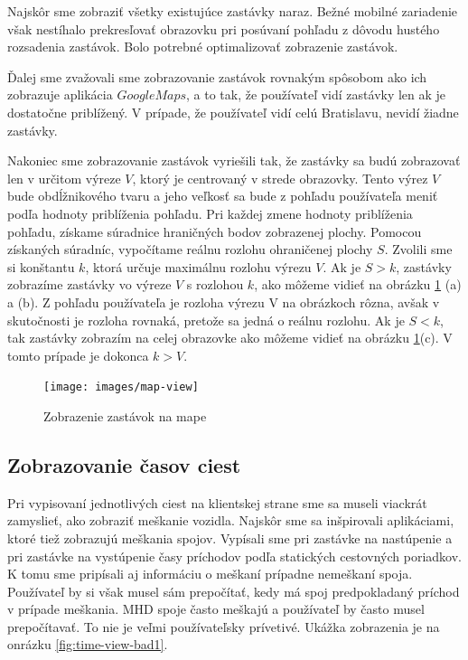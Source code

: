 Najskôr sme zobraziť všetky existujúce zastávky naraz. Bežné mobilné zariadenie však nestíhalo prekresľovať obrazovku pri posúvaní pohľadu z dôvodu hustého rozsadenia zastávok. Bolo potrebné optimalizovať zobrazenie zastávok. 

Ďalej sme zvažovali sme zobrazovanie zastávok rovnakým spôsobom ako ich zobrazuje aplikácia $Google Maps$, a to tak, že používateľ vidí zastávky len ak je dostatočne priblížený. V prípade, že používateľ vidí celú Bratislavu, nevidí žiadne zastávky. 

Nakoniec sme zobrazovanie zastávok vyriešili tak, že zastávky sa budú zobrazovať len v určitom výreze $V$, ktorý je centrovaný v strede obrazovky. Tento výrez $V$ bude obdĺžnikového tvaru a jeho veľkosť sa bude z pohľadu používateľa meniť podľa hodnoty priblíženia pohľadu. 
Pri každej zmene hodnoty priblíženia pohľadu, získame súradnice hraničných bodov zobrazenej plochy. Pomocou získaných súradníc, vypočítame reálnu rozlohu ohraničenej plochy $S$. Zvolili sme si konštantu $k$, ktorá určuje maximálnu rozlohu výrezu $V$. 
Ak je $S > k$, zastávky zobrazíme zastávky vo výreze $V$ s rozlohou $k$, ako môžeme vidieť na obrázku \ref{fig:map-view} (a) a (b). Z pohľadu používateľa je rozloha výrezu V na obrázkoch rôzna, avšak v skutočnosti je rozloha rovnaká, pretože sa jedná o reálnu rozlohu.
Ak je $S < k$, tak zastávky zobrazím na celej obrazovke ako môžeme vidieť na obrázku \ref{fig:map-view}(c). V tomto prípade je dokonca $k > V$.

\begin{figure}[H]
\centerline{\texttt{[image: images/map-view]}}
\caption[Zobrazenie zastávok na mape]{Zobrazenie zastávok na mape}
\label{fig:map-view}
\end{figure}

\subsection{Zobrazovanie časov ciest}
Pri vypisovaní jednotlivých ciest na klientskej strane sme sa museli viackrát zamyslieť, ako zobraziť meškanie vozidla. Najskôr sme sa inšpirovali aplikáciami, ktoré tiež zobrazujú meškania spojov. Vypísali sme pri zastávke na nastúpenie a pri zastávke na vystúpenie časy príchodov podľa statických cestovných poriadkov. K tomu sme pripísali aj informáciu o meškaní prípadne nemeškaní spoja. Používateľ by si však musel sám prepočítať, kedy má spoj predpokladaný príchod v prípade meškania. MHD spoje často meškajú a používateľ by často musel prepočítavať. To nie je veľmi používateľsky prívetivé. Ukážka zobrazenia je na onrázku \ref{fig:time-view-bad1}.

